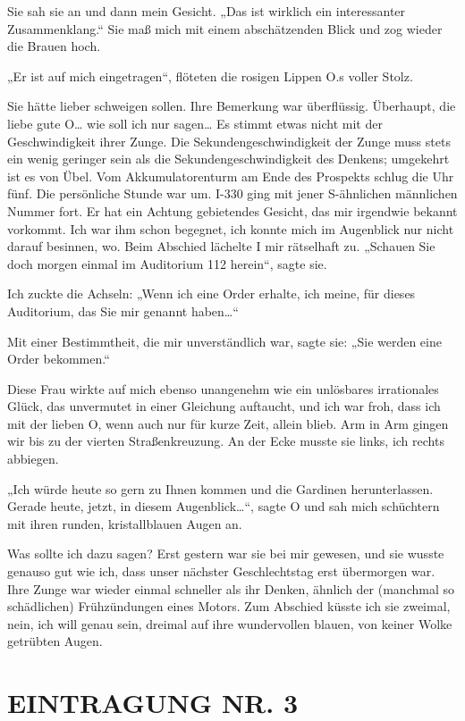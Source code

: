 Sie sah sie an und dann mein Gesicht. „Das ist wirklich ein
interessanter Zusammenklang.“ Sie maß mich mit einem abschätzenden
Blick und zog wieder die Brauen hoch.

„Er ist auf mich eingetragen“, flöteten die rosigen Lippen O.s
voller Stolz.

Sie hätte lieber schweigen sollen. Ihre Bemerkung war überflüssig.
Überhaupt, die liebe gute O\ldots{} wie soll ich nur sagen\ldots{} Es stimmt
etwas nicht mit der Geschwindigkeit ihrer Zunge. Die
Sekundengeschwindigkeit der Zunge muss stets ein wenig geringer
sein als die Sekundengeschwindigkeit des Denkens; umgekehrt ist es
von Übel. Vom Akkumulatorenturm am Ende des Prospekts schlug die
Uhr fünf. Die persönliche Stunde war um. I-330 ging mit jener
S-ähnlichen männlichen Nummer fort. Er hat ein Achtung gebietendes
Gesicht, das mir irgendwie bekannt vorkommt. Ich war ihm schon
begegnet, ich konnte mich im Augenblick nur nicht darauf besinnen,
wo. Beim Abschied lächelte I mir rätselhaft zu. „Schauen Sie doch
morgen einmal im Auditorium 112 herein“, sagte sie.

Ich zuckte die Achseln: „Wenn ich eine Order erhalte, ich meine,
für dieses Auditorium, das Sie mir genannt haben\ldots{}“

Mit einer Bestimmtheit, die mir unverständlich war, sagte sie: „Sie
werden eine Order bekommen.“

Diese Frau wirkte auf mich ebenso
unangenehm wie ein unlösbares irrationales Glück, das unvermutet in
einer Gleichung auftaucht, und ich war froh, dass ich mit der
lieben O, wenn auch nur für kurze Zeit, allein blieb. Arm in Arm
gingen wir bis zu der vierten Straßenkreuzung. An der Ecke musste
sie links, ich rechts abbiegen.

„Ich würde heute so gern zu Ihnen
kommen und die
Gardinen herunterlassen. Gerade heute, jetzt, in diesem
Augenblick\ldots{}“, sagte O und sah mich schüchtern mit ihren runden,
kristallblauen Augen an.

Was sollte ich dazu sagen? Erst gestern
war sie bei mir gewesen, und sie wusste genauso gut wie ich, dass
unser nächster Geschlechtstag erst übermorgen war. Ihre Zunge war
wieder einmal schneller als ihr Denken, ähnlich der (manchmal so
schädlichen) Frühzündungen eines Motors. Zum Abschied küsste ich
sie zweimal, nein, ich will genau sein, dreimal auf ihre
wundervollen blauen, von keiner Wolke getrübten Augen.

\section{EINTRAGUNG NR. 3}

